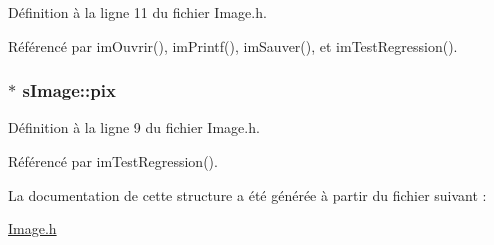 Définition à la ligne 11 du fichier Image.h.



Référencé par imOuvrir(), imPrintf(), imSauver(), et imTestRegression().

\hypertarget{structs_image_a6951df3303ff6144e7786fe41b056082}{
\subsubsection[{pix}]{$\ast$ {\bf sImage::pix}}}
\label{structs_image_a6951df3303ff6144e7786fe41b056082}


Définition à la ligne 9 du fichier Image.h.



Référencé par imTestRegression().



La documentation de cette structure a été générée à partir du fichier suivant :\begin{DoxyCompactItemize}
\item 
\hyperlink{_image_8h}{Image.h}\end{DoxyCompactItemize}
